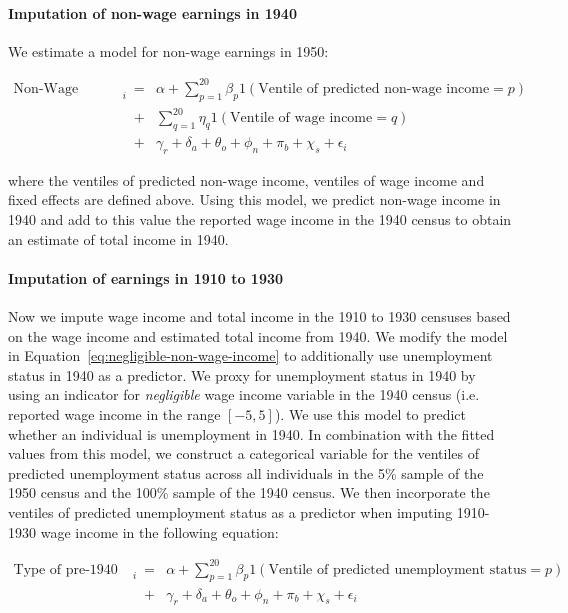 \documentclass[12pt]{article}
\begin{document}
\paragraph{Imputation of non-wage earnings in 1940} We estimate a model for non-wage earnings in 1950:

\begin{eqnarray}
    \text{Non-Wage Income}_{i}  &=& \alpha + \sum_{p=1}^{20} \beta_p 1(\text{Ventile of predicted non-wage income} = p) \nonumber \\
                                &+& \sum_{q=1}^{20} \eta_q 1(\text{Ventile of wage income} = q) \nonumber  \\
                                &+& \gamma_r + \delta_a + \theta_o + \phi_n + \pi_b + \chi_s + \epsilon_i \label{eq:non-wage-income}
\end{eqnarray}

\noindent where the ventiles of predicted non-wage income, ventiles of wage income and fixed effects are defined above. 
Using this model, we predict non-wage income in 1940 and add to this value the reported wage income in the 1940 census to obtain an estimate of total income in 1940.

\paragraph{Imputation of earnings in 1910 to 1930} Now we impute wage income and total income in the 1910 to 1930 censuses based on the wage income and estimated total income from 1940. 
We modify the model in Equation~\ref{eq:negligible-non-wage-income} to additionally use unemployment status in 1940 as a predictor. 
We proxy for unemployment status in 1940 by using an indicator for \emph{negligible} wage income variable in the 1940 census (i.e. reported wage income in the range $[-5,5]$). 
We use this model to predict whether an individual is unemployment in 1940. In combination with the fitted values from this model, we construct a categorical variable for the ventiles of predicted unemployment status across all individuals in the 5\% sample of the 1950 census and the 100\% sample of the 1940 census. 
We then incorporate the ventiles of predicted unemployment status as a predictor when imputing 1910-1930 wage income in the following equation:

\begin{eqnarray}
    \text{Type of pre-1940 Income}_{i}  &=& \alpha + \sum_{p=1}^{20} \beta_p 1(\text{Ventile of predicted unemployment status} = p) \nonumber \\
                                &+& \gamma_r + \delta_a + \theta_o + \phi_n + \pi_b + \chi_s + \epsilon_i \label{eq:pre-1940-income}
\end{eqnarray}
\end{document}
